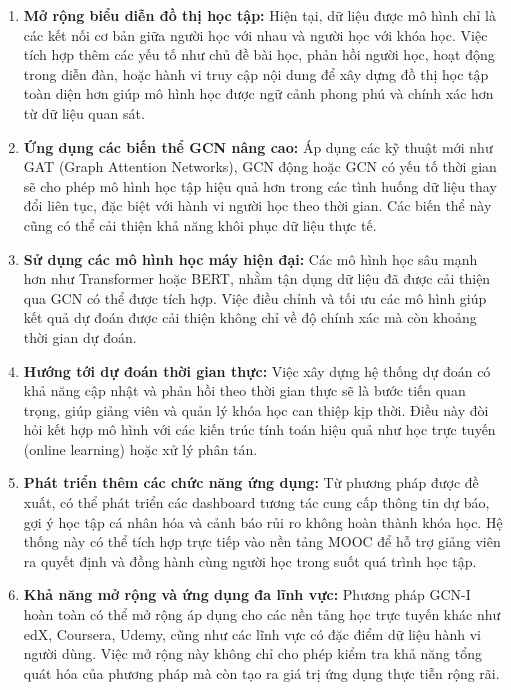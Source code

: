 \begin{enumerate}
    \item \textbf{Mở rộng biểu diễn đồ thị học tập:} Hiện tại, dữ liệu được mô hình chỉ là các kết nối cơ bản giữa người học với nhau và người học với khóa học. Việc tích hợp thêm các yếu tố như chủ đề bài học, phản hồi người học, hoạt động trong diễn đàn, hoặc hành vi truy cập nội dung để xây dựng đồ thị học tập toàn diện hơn giúp mô hình học được ngữ cảnh phong phú và chính xác hơn từ dữ liệu quan sát.

    \item \textbf{Ứng dụng các biến thể GCN nâng cao:} Áp dụng các kỹ thuật mới như GAT (Graph Attention Networks), GCN động hoặc GCN có yếu tố thời gian sẽ cho phép mô hình học tập hiệu quả hơn trong các tình huống dữ liệu thay đổi liên tục, đặc biệt với hành vi người học theo thời gian. Các biến thể này cũng có thể cải thiện khả năng khôi phục dữ liệu thực tế.

    \item \textbf{Sử dụng các mô hình học máy hiện đại:} Các mô hình học sâu mạnh hơn như Transformer hoặc BERT, nhằm tận dụng dữ liệu đã được cải thiện qua GCN có thể được tích hợp. Việc điều chỉnh và tối ưu các mô hình giúp kết quả dự đoán được cải thiện không chỉ về độ chính xác mà còn khoảng thời gian dự đoán.

    \item \textbf{Hướng tới dự đoán thời gian thực:} Việc xây dựng hệ thống dự đoán có khả năng cập nhật và phản hồi theo thời gian thực sẽ là bước tiến quan trọng, giúp giảng viên và quản lý khóa học can thiệp kịp thời. Điều này đòi hỏi kết hợp mô hình với các kiến trúc tính toán hiệu quả như học trực tuyến (online learning) hoặc xử lý phân tán.

    \item \textbf{Phát triển thêm các chức năng ứng dụng:} Từ phương pháp được đề xuất, có thể phát triển các dashboard tương tác cung cấp thông tin dự báo, gợi ý học tập cá nhân hóa và cảnh báo rủi ro không hoàn thành khóa học. Hệ thống này có thể tích hợp trực tiếp vào nền tảng MOOC để hỗ trợ giảng viên ra quyết định và đồng hành cùng người học trong suốt quá trình học tập.

    \item \textbf{Khả năng mở rộng và ứng dụng đa lĩnh vực:} Phương pháp GCN-I hoàn toàn có thể mở rộng áp dụng cho các nền tảng học trực tuyến khác như edX, Coursera, Udemy, cũng như các lĩnh vực có đặc điểm dữ liệu hành vi người dùng. Việc mở rộng này không chỉ cho phép kiểm tra khả năng tổng quát hóa của phương pháp mà còn tạo ra giá trị ứng dụng thực tiễn rộng rãi.
\end{enumerate}

